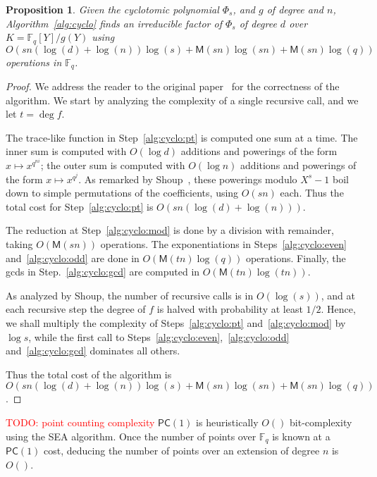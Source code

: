 \documentclass[12pt]{article}
\theoremstyle{plain}
\newtheorem{proposition}[theorem]{Proposition}
\theoremstyle{definition}
\newcommand{\todo}[1]{\textcolor{red}{TODO: #1}}
\def\F{\ensuremath{\mathbb{F}}}
\def\MM{\ensuremath{\mathsf{M}}}
\def\PC{\ensuremath{\mathsf{PC}}}
\newcounter{algorithm}
\begin{document}
\begin{proposition}
  \label{th:cyclo}
  Given the cyclotomic polynomial $\Phi_s$, and $g$ of degree and $n$,
  Algorithm~\ref{alg:cyclo} finds an irreducible factor of $\Phi_s$ of
  degree $d$ over $K=\F_q[Y]/g(Y)$ using $O(sn(\log(d)+\log(n))\log(s)
  + \MM(sn)\log(sn) + \MM(sn)\log(q))$ operations in $\F_q$.
\end{proposition}
\begin{proof}
  We address the reader to the original paper~\cite{shoup94} for the
  correctness of the algorithm. We start by analyzing the complexity
  of a single recursive call, and we let $t=\deg f$.

  The trace-like function in Step~\ref{alg:cyclo:pt} is computed one
  sum at a time. The inner sum is computed with $O(\log d)$ additions
  and powerings of the form $x\mapsto x^{q^{ni}}$; the outer sum is
  computed with $O(\log n)$ additions and powerings of the form
  $x\mapsto x^{q^j}$. As remarked by Shoup~\cite{shoup94}, these
  powerings modulo $X^s-1$ boil down to simple permutations of the
  coefficients, using $O(sn)$ each. Thus the total cost for
  Step~\ref{alg:cyclo:pt} is $O(sn(\log(d)+\log(n)))$.

  The reduction at Step~\ref{alg:cyclo:mod} is done by a division with
  remainder, taking $O(\MM(sn))$ operations. The exponentiations in
  Steps~\ref{alg:cyclo:even} and~\ref{alg:cyclo:odd} are done in
  $O(\MM(tn)\log(q))$ operations. Finally, the gcds in
  Step.~\ref{alg:cyclo:gcd} are computed in $O(\MM(tn)\log(tn))$.

  As analyzed by Shoup, the number of recursive calls is in
  $O(\log(s))$, and at each recursive step the degree of $f$ is halved
  with probability at least $1/2$. Hence, we shall multiply the
  complexity of Steps~\ref{alg:cyclo:pt} and~\ref{alg:cyclo:mod} by
  $\log s$, while the first call to
  Steps~\ref{alg:cyclo:even},~\ref{alg:cyclo:odd}
  and~\ref{alg:cyclo:gcd} dominates all others.
  
  Thus the total cost of the algorithm is
  $O(sn(\log(d)+\log(n))\log(s) + \MM(sn)\log(sn) + \MM(sn)\log(q))$.
\end{proof}

\todo{point counting complexity}
$\PC(1)$ is heuristically $O()$ bit-complexity
using the SEA algorithm.
Once the number of points over $\F_q$ is known at a $\PC(1)$ cost,
deducing the number of points over an extension of degree $n$ is
$O()$.


\end{document}
